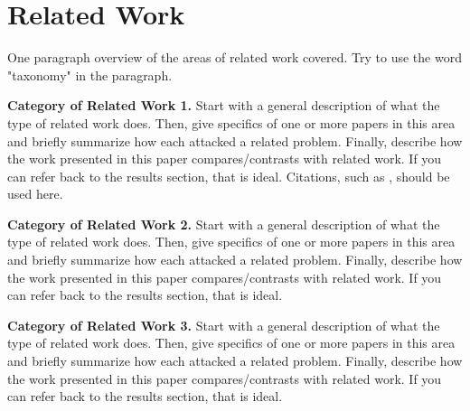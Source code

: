 \section{Related Work}
\label{relatedwork}

One paragraph overview of the areas of
related work covered. Try to use the word
"taxonomy" in the paragraph.

\textbf{Category of Related Work 1.} Start with
a general description of what the type of related
work does. Then, give specifics of one or more
papers in this area and briefly summarize how each
attacked a related problem. Finally, describe
how the work presented in this paper compares/contrasts
with related work. If you can refer back to the
results section, that is ideal. Citations, such as
\cite{rose2006mobile}, should be used here.

\textbf{Category of Related Work 2.} Start with
a general description of what the type of related
work does. Then, give specifics of one or more
papers in this area and briefly summarize how each
attacked a related problem. Finally, describe
how the work presented in this paper compares/contrasts
with related work. If you can refer back to the
results section, that is ideal.

\textbf{Category of Related Work 3.} Start with
a general description of what the type of related
work does. Then, give specifics of one or more
papers in this area and briefly summarize how each
attacked a related problem. Finally, describe
how the work presented in this paper compares/contrasts
with related work. If you can refer back to the
results section, that is ideal.
